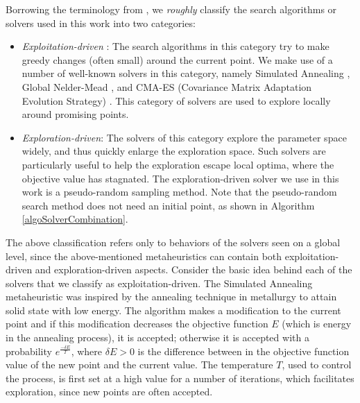 Borrowing the terminology from \cite{dreo:hal-01341683}, we {\em roughly} classify the search algorithms or solvers used in this work into two categories: 
\begin{itemize}
\item {\em Exploitation-driven} : The search algorithms in this category try to make greedy changes (often small) around the current point. We make use of a number of well-known solvers in this category, namely Simulated Annealing \cite{Kirkpatrick83optimizationby}, Global Nelder-Mead \cite{NelderMead65}, and CMA-ES (Covariance Matrix Adaptation Evolution Strategy) \cite{hansen2006eda}. This category of solvers are used to explore locally around promising points. 
\item {\em Exploration-driven}: The solvers of this category explore the parameter space widely, and thus quickly enlarge the exploration space. Such solvers are particularly useful to help the exploration escape local optima, where the objective value has stagnated. The exploration-driven solver we use in this work is a pseudo-random sampling method. Note that the pseudo-random search method does not need an initial point, as shown in Algorithm \ref{algoSolverCombination}. 
\end{itemize}
The above classification refers only to behaviors of the solvers seen on a global level, since the above-mentioned metaheuristics can contain both exploitation-driven and exploration-driven aspects. Consider the basic idea behind each of the solvers that we classify as exploitation-driven. 
The Simulated Annealing metaheuristic \cite{Kirkpatrick83optimizationby} was inspired by the annealing technique in metallurgy to attain solid state with low energy. The algorithm makes a modification to the current point and if this modification decreases the objective function $E$ (which is energy in the annealing process), it is accepted; otherwise it is accepted with a probability $e^{\frac{-\delta E}{T}}$, where $\delta E>0$ is the difference between in the objective function value of the new point and the current value. The temperature $T$, used to control the process, is first set at a high value for a number of iterations, which facilitates exploration, since new points are often accepted.
